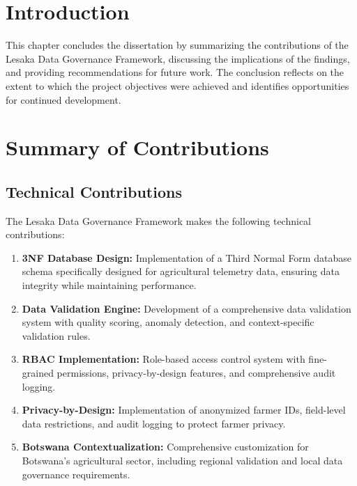 
\section{Introduction}

This chapter concludes the dissertation by summarizing the contributions of the Lesaka Data Governance Framework, discussing the implications of the findings, and providing recommendations for future work. The conclusion reflects on the extent to which the project objectives were achieved and identifies opportunities for continued development.

\section{Summary of Contributions}

\subsection{Technical Contributions}

The Lesaka Data Governance Framework makes the following technical contributions:

\begin{enumerate}
    \item \textbf{3NF Database Design:} Implementation of a Third Normal Form database schema specifically designed for agricultural telemetry data, ensuring data integrity while maintaining performance.
    
    \item \textbf{Data Validation Engine:} Development of a comprehensive data validation system with quality scoring, anomaly detection, and context-specific validation rules.
    
    \item \textbf{RBAC Implementation:} Role-based access control system with fine-grained permissions, privacy-by-design features, and comprehensive audit logging.
    
    \item \textbf{Privacy-by-Design:} Implementation of anonymized farmer IDs, field-level data restrictions, and audit logging to protect farmer privacy.
    
    \item \textbf{Botswana Contextualization:} Comprehensive customization for Botswana's agricultural sector, including regional validation and local data governance requirements.
\end{enumerate}

